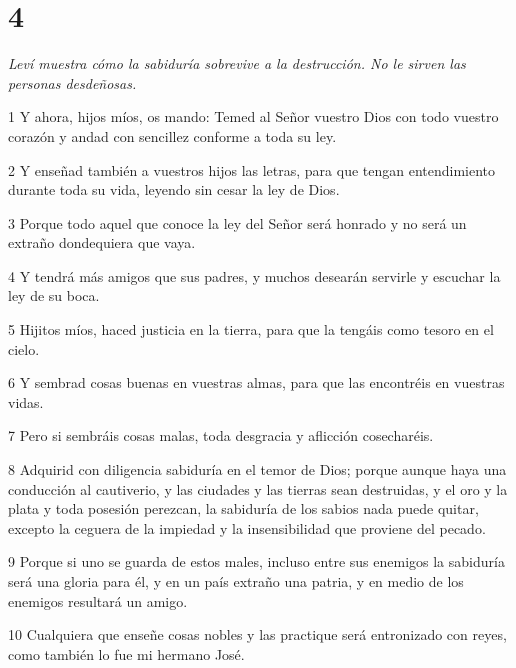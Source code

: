 \chapter{4}

\par \textit{Leví muestra cómo la sabiduría sobrevive a la destrucción. No le sirven las personas desdeñosas.}

\par 1 Y ahora, hijos míos, os mando: Temed al Señor vuestro Dios con todo vuestro corazón y andad con sencillez conforme a toda su ley.

\par 2 Y enseñad también a vuestros hijos las letras, para que tengan entendimiento durante toda su vida, leyendo sin cesar la ley de Dios.

\par 3 Porque todo aquel que conoce la ley del Señor será honrado y no será un extraño dondequiera que vaya.

\par 4 Y tendrá más amigos que sus padres, y muchos desearán servirle y escuchar la ley de su boca.

\par 5 Hijitos míos, haced justicia en la tierra, para que la tengáis como tesoro en el cielo.

\par 6 Y sembrad cosas buenas en vuestras almas, para que las encontréis en vuestras vidas.

\par 7 Pero si sembráis cosas malas, toda desgracia y aflicción cosecharéis.

\par 8 Adquirid con diligencia sabiduría en el temor de Dios; porque aunque haya una conducción al cautiverio, y las ciudades y las tierras sean destruidas, y el oro y la plata y toda posesión perezcan, la sabiduría de los sabios nada puede quitar, excepto la ceguera de la impiedad y la insensibilidad que proviene del pecado.

\par 9 Porque si uno se guarda de estos males, incluso entre sus enemigos la sabiduría será una gloria para él, y en un país extraño una patria, y en medio de los enemigos resultará un amigo.

\par 10 Cualquiera que enseñe cosas nobles y las practique será entronizado con reyes, como también lo fue mi hermano José.

